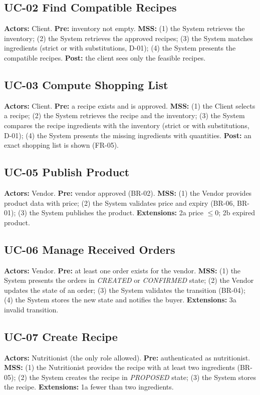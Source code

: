 \subsection*{UC-02 Find Compatible Recipes}
\textbf{Actors:} Client. \textbf{Pre:} inventory not empty.
\textbf{MSS:} (1) the System retrieves the inventory; (2) the System retrieves
the approved recipes; (3) the System matches ingredients (strict or with
substitutions, D-01); (4) the System presents the compatible recipes.
\textbf{Post:} the client sees only the feasible recipes.

\subsection*{UC-03 Compute Shopping List}
\textbf{Actors:} Client. \textbf{Pre:} a recipe exists and is approved.
\textbf{MSS:} (1) the Client selects a recipe; (2) the System retrieves the
recipe and the inventory; (3) the System compares the recipe ingredients
with the inventory (strict or with substitutions, D-01); (4) the System
presents the missing ingredients with quantities. \textbf{Post:} an exact shopping list is shown
(FR-05).

\subsection*{UC-05 Publish Product}
\textbf{Actors:} Vendor. \textbf{Pre:} vendor approved (BR-02).
\textbf{MSS:} (1) the Vendor provides product data with price; (2) the System
validates price and expiry (BR-06, BR-01); (3) the System publishes the
product. \textbf{Extensions:} 2a price $\leq 0$; 2b expired product.

\subsection*{UC-06 Manage Received Orders}
\textbf{Actors:} Vendor. \textbf{Pre:} at least one order exists for the
vendor. \textbf{MSS:} (1) the System presents the orders in \emph{CREATED} or
\emph{CONFIRMED} state; (2) the Vendor updates the state of an order;
(3) the System validates the transition (BR-04); (4) the System stores the new
state and notifies the buyer. \textbf{Extensions:} 3a invalid transition.

\subsection*{UC-07 Create Recipe}
\textbf{Actors:} Nutritionist (the only role allowed). \textbf{Pre:}
authenticated as nutritionist. \textbf{MSS:} (1) the Nutritionist provides the
recipe with at least two ingredients (BR-05); (2) the System creates the
recipe in \emph{PROPOSED} state; (3) the System stores the recipe.
\textbf{Extensions:} 1a fewer than two ingredients.

